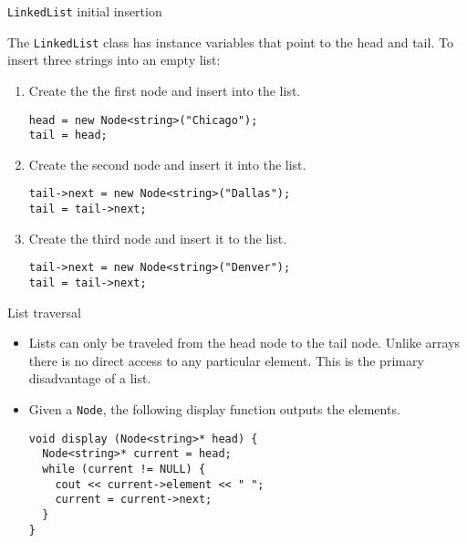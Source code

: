 \documentclass{beamer}
\begin{document}
\begin{frame}[fragile]{\lstinline$LinkedList$ initial insertion}

The \lstinline$LinkedList$ class has instance variables that point to
the head and tail. To insert three strings into an empty list:

\begin{enumerate}
\item Create the the first node and insert into the list.

\begin{lstlisting}
head = new Node<string>("Chicago");
tail = head;
\end{lstlisting}

\pause

\item Create the second node and insert it into the list.

\begin{lstlisting}
tail->next = new Node<string>("Dallas");
tail = tail->next;
\end{lstlisting}

\pause

\item Create the third node and insert it to the list.

\begin{lstlisting}
tail->next = new Node<string>("Denver");
tail = tail->next;
\end{lstlisting}

\end{enumerate}

\end{frame}


\begin{frame}[fragile]{List traversal}

\begin{itemize}

\item Lists can only be traveled from the head node to the tail node. Unlike
arrays there is no direct access to any particular element. This is
the primary disadvantage of a list.

\item Given a \lstinline$Node$, the following display function outputs the elements.

\begin{lstlisting}
void display (Node<string>* head) {
  Node<string>* current = head;
  while (current != NULL) {
    cout << current->element << " ";
    current = current->next;
  }
}
\end{lstlisting}

\end{itemize}

\end{frame}
\end{document}
